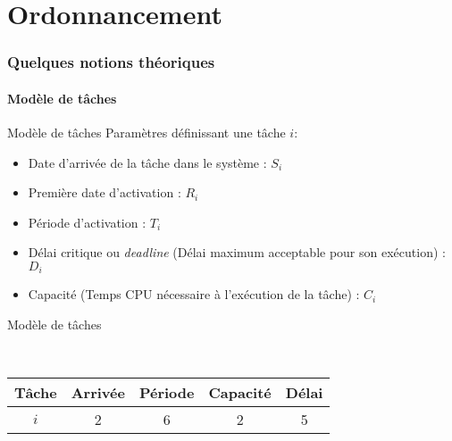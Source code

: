%
%
%

\part{Ordonnancement}

\begin{frame}
  \partpage
\end{frame}

\begin{frame}
  \tableofcontents
\end{frame}

\section{Quelques notions théoriques}

\subsection{Modèle de tâches}

\begin{frame}{Modèle de tâches}
  Paramètres définissant une tâche $i$:
  \begin{itemize}
    \item Date d'arrivée de la tâche dans le système : $S_i$
    \item Première date d'activation : $R_i$
    \item Période d'activation : $T_i$
    \item Délai critique  ou \emph{deadline} (Délai maximum acceptable
      pour son exécution) : $D_i$
    \item Capacité (Temps CPU nécessaire à l'exécution de la tâche) :
      $C_i$
  \end{itemize}
\end{frame}

\begin{frame}{Modèle de tâches}
  \begin{center}
    \\
    \begin{tabular}{ccccc}
      \hline
      Tâche & Arrivée & Période & Capacité & Délai \\
      \hline
      $i$ & 2 & 6 & 2 & 5\\
      \hline
    \end{tabular}
  \end{center}
\end{frame}


